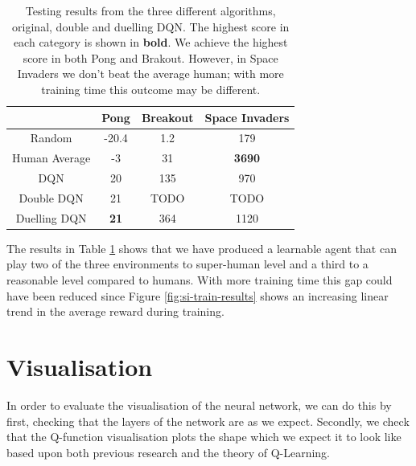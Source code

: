 \begin{table}[htbp]
  \centering
  \begin{tabular}{c|c|c|c|}
    \cline{2-4}
    \multicolumn{1}{l|}{}               & Pong        & Breakout      & Space Invaders \\ \hline
    \multicolumn{1}{|c|}{Random}        & -20.4       & 1.2           & 179            \\ \hline
    \multicolumn{1}{|c|}{Human Average} & -3          & 31            & \textbf{3690}  \\ \hline
    \multicolumn{1}{|c|}{DQN}           & 20          & 135           & 970            \\ \hline
    \multicolumn{1}{|c|}{Double DQN}    & 21          & TODO          & TODO           \\ \hline
    \multicolumn{1}{|c|}{Duelling DQN}  & \textbf{21} & 364 & 1120           \\ \hline
  \end{tabular}
  \caption[Testing results for Original/Double/Duelling DQN]{Testing results from the three different algorithms, original, double and duelling DQN. The highest score in each category is shown in \textbf{bold}. We achieve the highest score in both Pong and Brakout. However, in Space Invaders we don't beat the average human; with more training time this outcome may be different.}\label{table:eval:testing-results}
\end{table}

The results in Table \ref{table:eval:testing-results} shows that we have produced a learnable agent that can play two of the three environments to super-human level and a third to a reasonable level compared to humans. With more training time this gap could have been reduced since Figure \ref{fig:si-train-results} shows an increasing linear trend in the average reward during training.


\section{Visualisation}
In order to evaluate the visualisation of the neural network, we can do this by first, checking that the layers of the network are as we expect. Secondly, we check that the Q-function visualisation plots the shape which we expect it to look like based upon both previous research and the theory of Q-Learning.